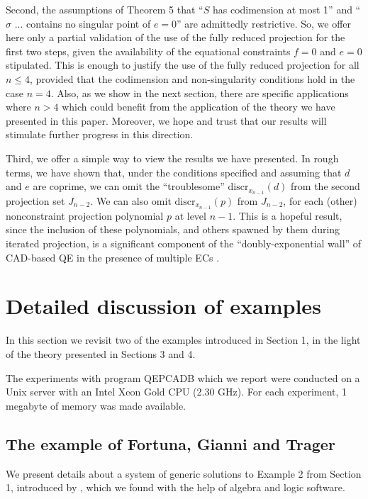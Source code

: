\documentclass{article}
\begin{document}
    Second, the assumptions of Theorem 5 that 
    ``$S$ has codimension at most 1'' and ``$\sigma$ ... contains
    no singular point of $e = 0$'' are admittedly restrictive.
    So, we offer here only a partial validation of the use
    of the fully reduced projection for the first two steps,
    given the availability of the equational constraints $f = 0$
    and $e = 0$ stipulated. This is enough to justify the use
    of the fully reduced projection for all $n \le 4$,
    provided that the codimension and non-singularity conditions hold
    in the case $n = 4$.
    Also, as we show in the next section,
    there are specific applications where $n > 4$
    which could benefit from
    the application of the theory we have presented in this paper.
    Moreover, we hope and trust that our results will stimulate
    further progress in this direction.

    Third, we offer a simple way to view the results we have presented.
    In rough terms, we have shown that, under the conditions
    specified and assuming that $d$ and $e$ are coprime, 
    we can omit the ``troublesome''
    $\mathrm{discr}_{x_{n-1}}(d)$ from the second projection set 
    $J_{n-2}$. We can also omit $\mathrm{discr}_{x_{n-1}}(p)$
    from $J_{n-2}$, for each (other) nonconstraint
    projection polynomial $p$ at level $n-1$.
    This is a hopeful result, since the inclusion
    of these polynomials, and others spawned by them during
    iterated projection, is a significant component of the
    ``doubly-exponential wall'' of CAD-based QE in the presence of
    multiple ECs \cite{DEMU25}.

\newpage 

\section{Detailed discussion of examples}

In this section we revisit two of the examples introduced in Section 1,
in the light of the theory presented in Sections 3 and 4.

The experiments with program QEPCADB which we report were conducted on
a Unix server with an Intel Xeon Gold CPU (2.30 GHz). For each
experiment, 1 megabyte of memory was made available.

\subsection{The example of Fortuna, Gianni and Trager}
We present details about a system of generic solutions
to Example 2 from Section 1, introduced by \cite{FGT01},
which we found with the help of algebra and logic software.
\end{document}
